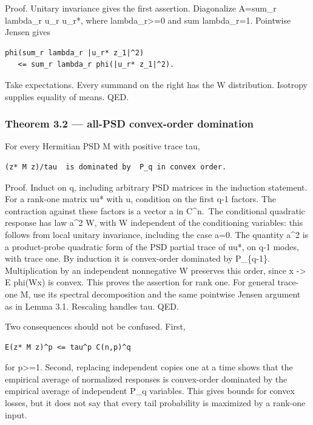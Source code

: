\documentclass[
  10pt,
]{article}
\begin{document}
Proof. Unitary invariance gives the first assertion. Diagonalize
A=sum\_r lambda\_r u\_r u\_r*, where lambda\_r\textgreater=0 and sum
lambda\_r=1. Pointwise Jensen gives

\begin{verbatim}
phi(sum_r lambda_r |u_r* z_1|^2)
   <= sum_r lambda_r phi(|u_r* z_1|^2).
\end{verbatim}

Take expectations. Every summand on the right has the W distribution.
Isotropy supplies equality of means. QED.

\subsubsection{Theorem 3.2 --- all-PSD convex-order
domination}\label{theorem-3.2-all-psd-convex-order-domination}

For every Hermitian PSD M with positive trace tau,

\begin{verbatim}
(z* M z)/tau  is dominated by  P_q in convex order.
\end{verbatim}

Proof. Induct on q, including arbitrary PSD matrices in the induction
statement. For a rank-one matrix uu* with
\textbar\textbar u\textbar{}, condition on the first q-1
factors. The contraction against these factors is a vector a in
C\^{}n.~The conditional quadratic response has law
\textbar\textbar a\textbar\textbar\^{}2 W, with W independent of the
conditioning variables: this follows from local unitary invariance,
including the case a=0. The quantity
\textbar\textbar a\textbar\textbar\^{}2 is a product-probe quadratic
form of the PSD partial trace of uu*, on q-1 modes, with trace one. By
induction it is convex-order dominated by P\_\{q-1\}. Multiplication by
an independent nonnegative W preserves this order, since x
-\textgreater{} E phi(Wx) is convex. This proves the assertion for rank
one. For general trace-one M, use its spectral decomposition and the
same pointwise Jensen argument as in Lemma 3.1. Rescaling handles tau.
QED.

Two consequences should not be confused. First,

\begin{verbatim}
E(z* M z)^p <= tau^p C(n,p)^q
\end{verbatim}

for p\textgreater=1. Second, replacing independent copies one at a time
shows that the empirical average of normalized responses is convex-order
dominated by the empirical average of independent P\_q variables. This
gives bounds for convex losses, but it does not say that every tail
probability is maximized by a rank-one input.
\end{document}
